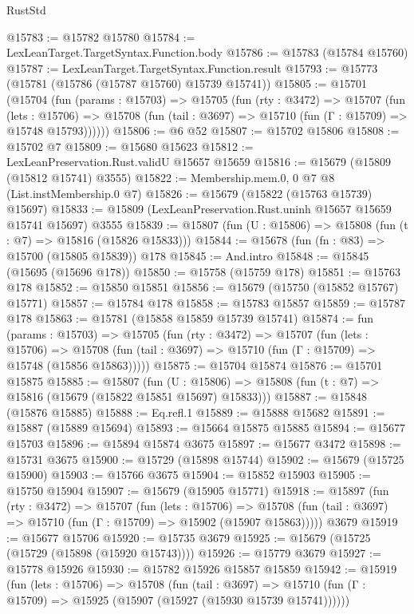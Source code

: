 \begin{lexlean}{RustStd}
\begin{coremodule}
{\begin{coremodule}
{{{{{{{{{{{{{{{{{{{{{{{{{{{{{{{{{{{{{{{{{{{{{{{@15783 := @15782 @15780
@15784 := LexLeanTarget.TargetSyntax.Function.body
@15786 := @15783 (@15784 @15760)
@15787 := LexLeanTarget.TargetSyntax.Function.result
@15793 := @15773 (@15781 (@15786 (@15787 @15760) @15739 @15741))
@15805 := @15701
    (@15704
      (fun (params : @15703) =>
      @15705
        (fun (rty : @3472) =>
        @15707
          (fun (lets : @15706) =>
          @15708 (fun (tail : @3697) => @15710 (fun (Γ : @15709) => @15748 @15793))))))
@15806 := @6 @52
@15807 := @15702 @15806
@15808 := @15702 @7
@15809 := @15680 @15623
@15812 := LexLeanPreservation.Rust.validU @15657 @15659
@15816 := @15679 (@15809 (@15812 @15741) @3555)
@15822 := Membership.mem.{0, 0} @7 @8 (List.instMembership.{0} @7)
@15826 := @15679 (@15822 (@15763 @15739) @15697)
@15833 := @15809 (LexLeanPreservation.Rust.uninh @15657 @15659 @15741 @15697) @3555
@15839 := @15807 (fun (U : @15806) => @15808 (fun (t : @7) => @15816 (@15826 @15833)))
@15844 := @15678 (fun (fn : @83) => @15700 (@15805 @15839)) @178
@15845 := And.intro
@15848 := @15845 (@15695 (@15696 @178))
@15850 := @15758 (@15759 @178)
@15851 := @15763 @178
@15852 := @15850 @15851
@15856 := @15679 (@15750 (@15852 @15767) @15771)
@15857 := @15784 @178
@15858 := @15783 @15857
@15859 := @15787 @178
@15863 := @15781 (@15858 @15859 @15739 @15741)
@15874 := fun (params : @15703) =>
  @15705
    (fun (rty : @3472) =>
    @15707
      (fun (lets : @15706) =>
      @15708 (fun (tail : @3697) => @15710 (fun (Γ : @15709) => @15748 (@15856 @15863)))))
@15875 := @15704 @15874
@15876 := @15701 @15875
@15885 := @15807
    (fun (U : @15806) => @15808 (fun (t : @7) => @15816 (@15679 (@15822 @15851 @15697) @15833)))
@15887 := @15848 (@15876 @15885)
@15888 := Eq.refl.{1}
@15889 := @15888 @15682
@15891 := @15887 (@15889 @15694)
@15893 := @15664 @15875 @15885
@15894 := @15677 @15703
@15896 := @15894 @15874 @3675
@15897 := @15677 @3472
@15898 := @15731 @3675
@15900 := @15729 (@15898 @15744)
@15902 := @15679 (@15725 @15900)
@15903 := @15766 @3675
@15904 := @15852 @15903
@15905 := @15750 @15904
@15907 := @15679 (@15905 @15771)
@15918 := @15897
    (fun (rty : @3472) =>
    @15707
      (fun (lets : @15706) =>
      @15708 (fun (tail : @3697) => @15710 (fun (Γ : @15709) => @15902 (@15907 @15863)))))
    @3679
@15919 := @15677 @15706
@15920 := @15735 @3679
@15925 := @15679 (@15725 (@15729 (@15898 (@15920 @15743))))
@15926 := @15779 @3679
@15927 := @15778 @15926
@15930 := @15782 @15926 @15857 @15859
@15942 := @15919
    (fun (lets : @15706) =>
    @15708
      (fun (tail : @3697) =>
      @15710 (fun (Γ : @15709) => @15925 (@15907 (@15927 (@15930 @15739 @15741))))))
}}}}}}}}}}}}}}}}}}}}}}}}}}}}}}}}}}}}}}}}}}}}}}}
\end{coremodule}}
\end{coremodule}
\end{lexlean}
